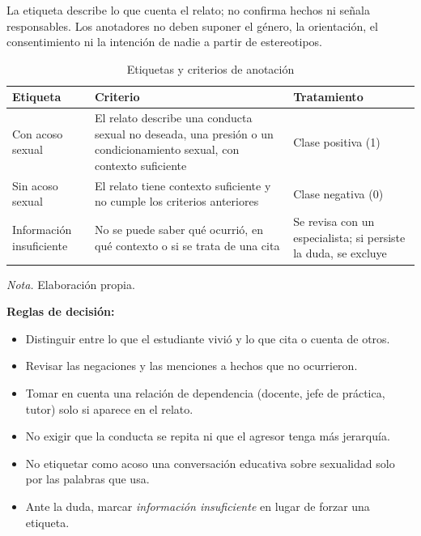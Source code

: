 
La etiqueta describe lo que cuenta el relato; no confirma hechos ni señala responsables. Los anotadores no deben suponer el género, la orientación, el consentimiento ni la intención de nadie a partir de estereotipos.

\begin{table}[H]
\begin{threeparttable}
\caption{Etiquetas y criterios de anotación}
\label{tab:anotacion}
\renewcommand{\arraystretch}{1.3}
\begin{tabular}{@{}L{3.3cm} L{7.4cm} L{4.6cm}@{}}
\toprule
\textbf{Etiqueta} & \textbf{Criterio} & \textbf{Tratamiento} \\
\midrule
Con acoso sexual & El relato describe una conducta sexual no deseada, una presión o un condicionamiento sexual, con contexto suficiente & Clase positiva (1) \\
Sin acoso sexual & El relato tiene contexto suficiente y no cumple los criterios anteriores & Clase negativa (0) \\
Información insuficiente & No se puede saber qué ocurrió, en qué contexto o si se trata de una cita & Se revisa con un especialista; si persiste la duda, se excluye \\
\bottomrule
\end{tabular}
\begin{tablenotes}[flushleft]
\small
\item \textit{Nota.} Elaboración propia.
\end{tablenotes}
\end{threeparttable}
\end{table}

\noindent\textbf{Reglas de decisión:}
\begin{itemize}
	\item Distinguir entre lo que el estudiante vivió y lo que cita o cuenta de otros.
	\item Revisar las negaciones y las menciones a hechos que no ocurrieron.
	\item Tomar en cuenta una relación de dependencia (docente, jefe de práctica, tutor) solo si aparece en el relato.
	\item No exigir que la conducta se repita ni que el agresor tenga más jerarquía.
	\item No etiquetar como acoso una conversación educativa sobre sexualidad solo por las palabras que usa.
	\item Ante la duda, marcar \textit{información insuficiente} en lugar de forzar una etiqueta.
\end{itemize}
